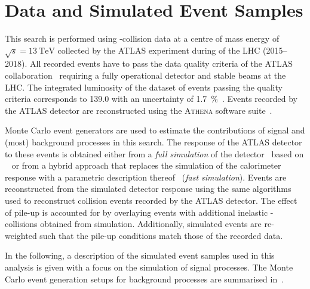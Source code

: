 \section{Data and Simulated Event Samples}
\label{sec:data_and_simulation}

This search is performed using \pp-collision data at a centre of mass
energy of $\sqrt{s} = \SI{13}{\TeV}$ collected by the ATLAS experiment
during \RunTwo of the LHC (2015--2018). All recorded events have to
pass the data quality criteria of the ATLAS
collaboration~\cite{DAPR-2018-01} requiring a fully operational
detector and stable beams at the LHC. The integrated luminosity of the
dataset of events passing the quality criteria corresponds to
\SI{139.0}{\ifb} with an uncertainty of
\SI{1.7}{\percent}~\cite{ATLAS-CONF-2019-021}.
Events recorded by the ATLAS detector are reconstructed using the
\textsc{Athena} software suite~\cite{ATL-SOFT-PUB-2021-001}.


Monte Carlo event generators are used to estimate the contributions of
signal and (most) background processes in this search. The response of
the ATLAS detector to these events is obtained either from a
\emph{full simulation} of the detector~\cite{SOFT-2010-01} based on
\GEANT~\cite{Agostinelli:2002hh} or from a hybrid approach that
replaces the simulation of the calorimeter response with a parametric
description thereof~\cite{SOFT-2010-01} (\emph{fast
  simulation}). Events are reconstructed from the simulated detector
response using the same algorithms used to reconstruct collision
events recorded by the ATLAS detector. The effect of pile-up is
accounted for by overlaying events with additional inelastic
\pp-collisions obtained from simulation. Additionally, simulated
events are re-weighted such that the pile-up conditions match those of
the recorded data.

In the following, a description of the simulated event samples used in
this analysis is given with a focus on the simulation of signal
processes. The Monte Carlo event generation setups for background
processes are summarised in~.

